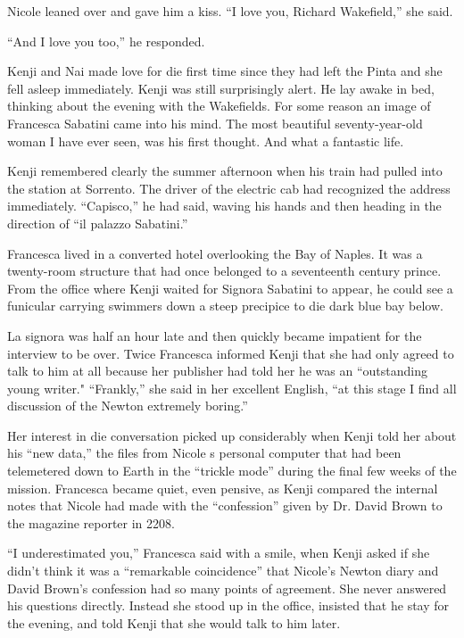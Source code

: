 \documentclass[]{article}
\begin{document}
{Nicole leaned over and gave him a kiss.  “I love you, Richard Wakefield,” she said.

“And I love you too,” he responded.

Kenji and Nai made love for die first time since they had left the Pinta and she fell asleep immediately.  Kenji was still surprisingly alert.  He lay awake in bed, thinking about the evening with the Wakefields.  For some reason an image of Francesca Sabatini came into his mind.  The most beautiful seventy-year-old woman I have ever seen, was his first thought.  And what a fantastic life.

Kenji remembered clearly the summer afternoon when his train had pulled into the station at Sorrento.  The driver of the electric cab had recognized the address immediately.  “Capisco,” he had said, waving his hands and then heading in the direction of “il palazzo Sabatini.”

Francesca lived in a converted hotel overlooking the Bay of Naples.  It was a twenty-room structure that had once belonged to a seventeenth century prince.  From the office where Kenji waited for Signora Sabatini to appear, he could see a funicular carrying swimmers down a steep precipice to die dark blue bay below.

La signora was half an hour late and then quickly became impatient for the interview to be over.  Twice Francesca informed Kenji that she had only agreed to talk to him at all because her publisher had told her he was an “outstanding young writer."  “Frankly,” she said in her excellent English, “at this stage I find all discussion of the Newton extremely boring.”

Her interest in die conversation picked up considerably when Kenji told her about his “new data,” the files from Nicole s personal computer that had been telemetered down to Earth in the “trickle mode” during the final few weeks of the mission.  Francesca became quiet, even pensive, as Kenji compared the internal notes that Nicole had made with the “confession” given by Dr.  David Brown to the magazine reporter in 2208.

“I underestimated you,” Francesca said with a smile, when Kenji asked if she didn’t think it was a “remarkable coincidence” that Nicole’s Newton diary and David Brown’s confession had so many points of agreement.  She never answered his questions directly.  Instead she stood up in the office, insisted that he stay for the evening, and told Kenji that she would talk to him later.

}
\end{document}

